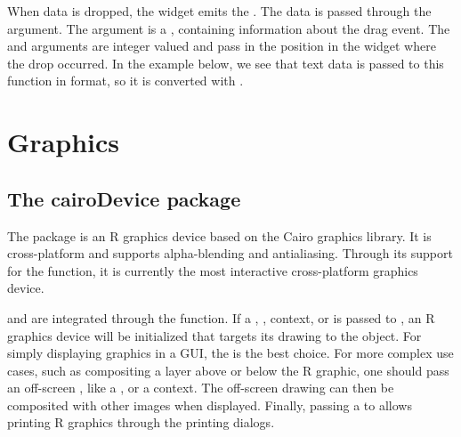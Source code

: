 When data is dropped, the widget emits the
. The data is passed through the
 argument. The  argument is a
, containing information about the drag
event. The  and  arguments are integer valued and pass
in the position in the widget where the drop occurred. In the example
below, we see that text data is passed to this function in 
format, so it is converted with .

\begin{Schunk}
\end{Schunk}


\section{Graphics}


\subsection{The cairoDevice package}
\label{sec:cairodevice-package}

The package  is an R graphics device based on the
Cairo graphics library.  It is cross-platform and supports
alpha-blending and antialiasing. Through its support for the
 function, it is currently the most
interactive cross-platform graphics device.  

 and  are integrated through the
 function. If a ,
,  context, or 
is passed to , an R graphics device will be
initialized that targets its drawing to the object. For simply
displaying graphics in a GUI, the  is the best
choice. 
For more complex use cases, such as compositing a layer above
or below the R graphic, one should pass an off-screen
, like a , or a 
context. The off-screen drawing can then be composited with other
images when displayed. Finally, passing a  to
 allows printing R graphics through the \GTK\/
printing dialogs.


